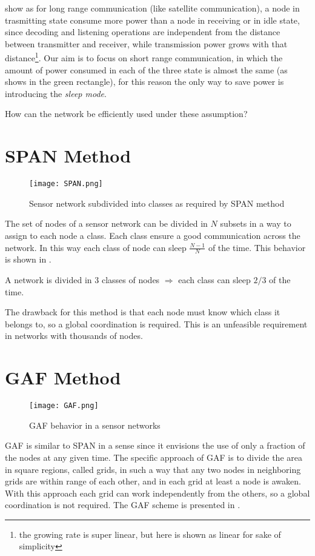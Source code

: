  show as for long range communication (like satellite communication), a node in trasmitting state consume more power than a node in receiving or in idle state, since decoding and listening operations are independent from the distance between transmitter and receiver, while transmission power grows with that distance\footnote{the growing rate is super linear, but here is shown as linear for sake of simplicity}.
Our aim is to focus on short range communication, in which the amount of power consumed in each of the three state is almost the same (as  shows in the green rectangle), for this reason the only way to save power is introducing the \textit{sleep mode}.

How can the network be efficiently used under these assumption?

\section{SPAN Method}
\begin{figure}[h]
	\centering
	\texttt{[image: SPAN.png]}
	\caption{Sensor network subdivided into classes as required by SPAN method}
	\label{fig:SPAN}
\end{figure}

The set of nodes of a sensor network can be divided in $N$ subsets in a way to assign to each node a class.
Each class ensure a good communication across the network.
In this way each class of node can sleep $\frac{N-1}{N}$ of the time.
This behavior is shown in .

\begin{example}
	A network is divided in 3 classes of nodes $\Rightarrow$ each class can sleep $2/3$ of the time.
\end{example}

The drawback for this method is that each node must know which class it belongs to, so a global coordination is required. This is an unfeasible requirement in networks with thousands of nodes.

\section{GAF Method}
\begin{figure}[h]
	\centering
	\texttt{[image: GAF.png]}
	\caption{GAF behavior in a sensor networks}
	\label{fig:GAF}
\end{figure}
GAF is similar to SPAN in a sense since it envisions the use of only a fraction of the nodes at any given time. The
specific approach of GAF is to divide the area in square
regions, called grids, in such a way that any two nodes in
neighboring grids are within range of each other, and in each grid at least a node is awaken. With this approach each grid can work independently from the others, so a global coordination is not required. The GAF scheme is presented in .

